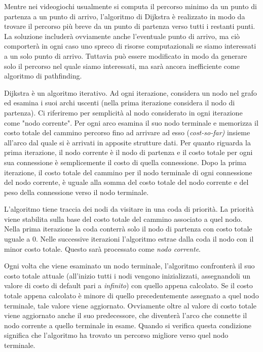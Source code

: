 \documentclass[11pt]{article}
\begin{document}
\par{Mentre nei videogiochi usualmente si computa il percorso minimo da un punto di partenza a un punto di arrivo, l'algoritmo di Dijkstra \`e realizzato in modo da trovare il percorso pi\`u breve da un punto di partenza verso tutti i restanti punti.
La soluzione includer\`a ovviamente anche l'eventuale punto di arrivo, ma ci\`o comporter\`a in ogni caso uno spreco di risorse computazionali se siamo interessati a un solo punto di arrivo.
Tuttavia pu\`o essere modificato in modo da generare solo il percorso nel quale siamo interessati, ma sar\`a ancora inefficiente come algoritmo di pathfinding.
}
\par{
Dijkstra \`e un algoritmo iterativo. Ad ogni iterazione, considera un nodo nel grafo ed esamina i suoi archi uscenti (nella prima iterazione considera il nodo di partenza). Ci riferiremo per semplicit\`a al nodo considerato in ogni iterazione come "nodo corrente".
Per ogni arco esamina il suo nodo terminale e memorizza il costo totale del cammino percorso fino ad arrivare ad esso (\emph{cost-so-far)} insieme all'arco dal quale si \`e arrivati in apposite strutture dati. Per quanto riguarda la prima iterazione, il nodo corrente \`e il nodo di partenza e il costo totale per ogni sua connessione \`e semplicemente il costo di quella connessione.
Dopo la prima iterazione, il costo totale del cammino per il nodo terminale di ogni connessione del nodo corrente, \`e uguale alla somma del costo totale del nodo corrente e del peso della connessione verso il nodo terminale.
}
\par{
L'algoritmo tiene traccia dei nodi da visitare in una coda di priorit\`a. La priorit\`a viene stabilita sulla base del costo totale del cammino associato a quel nodo. Nella prima iterazione la coda conterr\`a solo il nodo di partenza con costo totale uguale a 0. Nelle successive iterazioni l'algoritmo estrae dalla coda il nodo con il minor costo totale. Questo sar\`a processato come \emph{nodo corrente}.
}
\par{
Ogni volta che viene esaminato un nodo terminale, l'algoritmo confronter\`a il suo costo totale attuale (all'inizio tutti i nodi vengono inizializzati, assegnandoli un valore di costo di default pari a \emph{infinito}) con quello appena calcolato. Se il costo totale appena calcolato \`e minore di quello precedentemente assegnato a quel nodo terminale, tale valore viene aggiornato. Ovviamente oltre al valore di costo totale viene aggiornato anche il suo predecessore, che diventer\`a l'arco che connette il nodo corrente a quello terminale in esame. Quando si verifica questa condizione significa che l'algoritmo ha trovato un percorso migliore verso quel nodo terminale.
}
\end{document}
